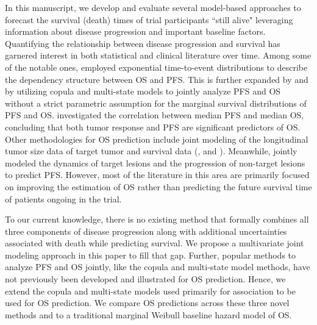 \documentclass[aoas]{imsart}
\theoremstyle{plain}
\theoremstyle{remark}
\begin{document}
In this manuscript, we develop and evaluate several model-based approaches to forecast the survival (death) times of trial participants ``still alive" leveraging information about disease progression and important baseline factors. Quantifying the relationship between disease progression and survival has garnered interest in both statistical and clinical literature over time. Among some of the notable ones, \cite{fleischer2009statistical} employed exponential time-to-event distributions to describe the dependency structure between OS and PFS. This is further expanded by \cite{fu2013joint, weber2019quantifying} and \cite{meller2019joint} by utilizing copula and multi-state models to jointly analyze PFS and OS without a strict parametric assumption for the marginal survival distributions of PFS and OS. \cite{shukuya2016relationship} investigated the correlation between median PFS and median OS, concluding that both tumor response and PFS are significant predictors of OS. Other methodologies for OS prediction include joint modeling of the longitudinal tumor size data of target tumor and survival data (\cite{claret2009model, claret2013evaluation, wang2009elucidation, bruno2014evaluation, zecchin2016models}, and \cite{lim2019predicting}). Meanwhile, \cite{yu2020new} jointly modeled the dynamics of target lesions and the progression of non-target lesions to predict PFS. However, most of the literature in this area are primarily focused on improving the estimation of OS rather than predicting the future survival time of patients ongoing in the trial. 

To our current knowledge, there is no existing method that formally combines all three components of disease progression along with additional uncertainties associated with death while predicting survival. We propose a multivariate joint modeling approach in this paper to fill that gap. Further, popular methods to analyze PFS and OS jointly, like the copula and multi-state model methods, have not previously been developed and illustrated for OS prediction. Hence, we extend the copula and multi-state models used primarily for association to be used for OS prediction. We compare OS predictions across these three novel methods and to a traditional marginal Weibull baseline hazard model of OS.
\end{document}
